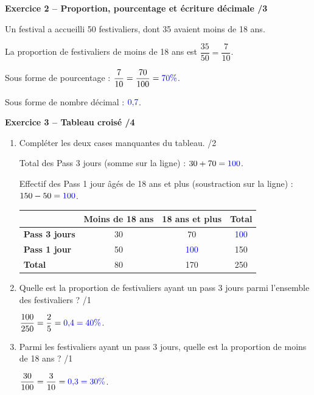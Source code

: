 \documentclass[10pt,a4paper]{article}
\begin{document}
\textbf{Exercice 2 -- Proportion, pourcentage et écriture décimale \hfill /3}

Un festival a accueilli 50 festivaliers, dont 35 avaient moins de 18 ans.

La proportion de festivaliers de moins de 18 ans est \(\dfrac{35}{50}=\dfrac{7}{10}\).

Sous forme de pourcentage : \(\dfrac{7}{10}=\dfrac{70}{100}=\textcolor{blue}{70\%}\).

Sous forme de nombre décimal : \(\textcolor{blue}{0{,}7}\).

\textbf{Exercice 3 -- Tableau croisé \hfill /4}

\begin{enumerate}
\item Compléter les deux cases manquantes du tableau. \hfill /2

Total des Pass 3 jours (somme sur la ligne) : \(30+70=\textcolor{blue}{100}\).

Effectif des Pass 1 jour âgés de 18 ans et plus (soustraction sur la ligne) : \(150-50=\textcolor{blue}{100}\).

\begin{center}
\renewcommand{\arraystretch}{1.5}
\begin{tabular}{|l|c|c|c|}
\hline
 & \textbf{Moins de 18 ans} & \textbf{18 ans et plus} & \textbf{Total} \\
\hline
\textbf{Pass 3 jours} & 30 & 70 & \textcolor{blue}{100} \\
\hline
\textbf{Pass 1 jour} & 50 & \textcolor{blue}{100} & 150 \\
\hline
\textbf{Total} & 80 & 170 & 250 \\
\hline
\end{tabular}
\end{center}

\item Quelle est la proportion de festivaliers ayant un pass 3 jours parmi l'ensemble des festivaliers ? \hfill /1

\(\dfrac{100}{250}=\dfrac{2}{5}=\textcolor{blue}{0{,}4=40\%}\).

\item Parmi les festivaliers ayant un pass 3 jours, quelle est la proportion de moins de 18 ans ? \hfill /1

\(\dfrac{30}{100}=\dfrac{3}{10}=\textcolor{blue}{0{,}3=30\%}\).
\end{enumerate}
\end{document}
